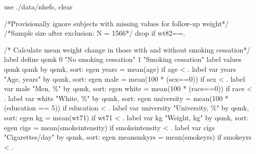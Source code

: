 \documentclass[
  10pt,
  a4paper,
]{book}
\newenvironment{Shaded}{\begin{snugshade}}{\end{snugshade}}
\newcommand{\BaseNTok}[1]{\textcolor[rgb]{0.68,0.00,0.00}{#1}}
\newcommand{\CommentTok}[1]{\textcolor[rgb]{0.37,0.37,0.37}{#1}}
\newcommand{\KeywordTok}[1]{\textcolor[rgb]{0.00,0.46,0.62}{#1}}
\newcommand{\NormalTok}[1]{\textcolor[rgb]{0.00,0.46,0.62}{#1}}
\newcommand{\StringTok}[1]{\textcolor[rgb]{0.13,0.47,0.30}{#1}}
\begin{document}
\begin{Shaded}
\begin{Highlighting}[]
\KeywordTok{use}\NormalTok{ ./}\KeywordTok{data}\NormalTok{/nhefs, }\KeywordTok{clear}

\CommentTok{/*Provisionally ignore subjects with missing values for follow{-}up weight*/}
\CommentTok{/*Sample size after exclusion: N = 1566*/}
\KeywordTok{drop} \KeywordTok{if}\NormalTok{ wt82==.}

\CommentTok{/* Calculate mean weight change in those with and without smoking cessation*/}
\KeywordTok{label} \KeywordTok{define}\NormalTok{ qsmk 0 }\StringTok{"No smoking cessation"}\NormalTok{ 1 }\StringTok{"Smoking cessation"}
\KeywordTok{label} \KeywordTok{values}\NormalTok{ qsmk qsmk}
\KeywordTok{by}\NormalTok{ qsmk, }\KeywordTok{sort}\NormalTok{: }\KeywordTok{egen}\NormalTok{ years = }\KeywordTok{mean}\NormalTok{(age) }\KeywordTok{if}\NormalTok{ age \textless{} . }
\KeywordTok{label} \KeywordTok{var}\NormalTok{ years }\StringTok{"Age, years"}
\KeywordTok{by}\NormalTok{ qsmk, }\KeywordTok{sort}\NormalTok{: }\KeywordTok{egen}\NormalTok{ male = }\KeywordTok{mean}\NormalTok{(100 * (sex==0)) }\KeywordTok{if}\NormalTok{ sex \textless{} . }
\KeywordTok{label} \KeywordTok{var}\NormalTok{ male }\StringTok{"Men, \%"}
\KeywordTok{by}\NormalTok{ qsmk, }\KeywordTok{sort}\NormalTok{: }\KeywordTok{egen} \BaseNTok{white}\NormalTok{ = }\KeywordTok{mean}\NormalTok{(100 * (race==0)) }\KeywordTok{if}\NormalTok{ race \textless{} . }
\KeywordTok{label} \KeywordTok{var} \BaseNTok{white} \StringTok{"White, \%"}
\KeywordTok{by}\NormalTok{ qsmk, }\KeywordTok{sort}\NormalTok{: }\KeywordTok{egen}\NormalTok{ university = }\KeywordTok{mean}\NormalTok{(100 * (education == 5)) }\KeywordTok{if}\NormalTok{ education \textless{} .}
\KeywordTok{label} \KeywordTok{var}\NormalTok{ university }\StringTok{"University, \%"}
\KeywordTok{by}\NormalTok{ qsmk, }\KeywordTok{sort}\NormalTok{: }\KeywordTok{egen}\NormalTok{ kg = }\KeywordTok{mean}\NormalTok{(wt71) }\KeywordTok{if}\NormalTok{ wt71 \textless{} .}
\KeywordTok{label} \KeywordTok{var}\NormalTok{ kg }\StringTok{"Weight, kg"}
\KeywordTok{by}\NormalTok{ qsmk, }\KeywordTok{sort}\NormalTok{: }\KeywordTok{egen}\NormalTok{ cigs = }\KeywordTok{mean}\NormalTok{(smokeintensity) }\KeywordTok{if}\NormalTok{ smokeintensity \textless{} . }
\KeywordTok{label} \KeywordTok{var}\NormalTok{ cigs }\StringTok{"Cigarettes/day"}
\KeywordTok{by}\NormalTok{ qsmk, }\KeywordTok{sort}\NormalTok{: }\KeywordTok{egen}\NormalTok{ meansmkyrs = }\KeywordTok{mean}\NormalTok{(smokeyrs) }\KeywordTok{if}\NormalTok{ smokeyrs \textless{} .}

\end{Highlighting}
\end{Shaded}
\end{document}

